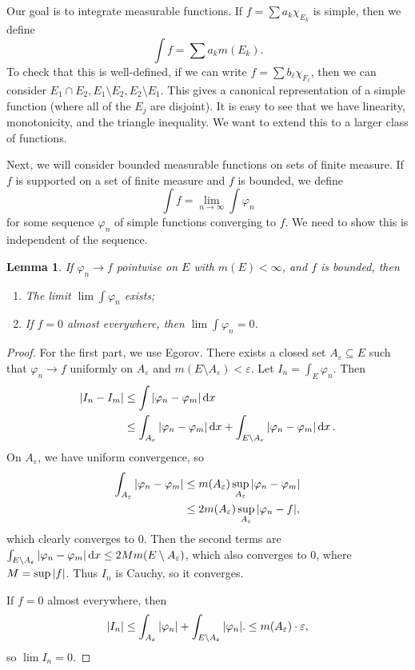 \documentclass[leqno, openany]{memoir}
\newtheorem{lem}[thm]{Lemma}
\theoremstyle{definition}
\theoremstyle{remark}
\theoremstyle{plain}
\theoremstyle{definition}
\theoremstyle{remark}
\newcommand{\ep}{\varepsilon}
\begin{document}
Our goal is to integrate measurable functions. If $f = \sum a_k \chi_{E_k}$ is
simple, then we define \[ \int f = \sum a_k m(E_k). \] To check that this is
well-defined, if we can write $f = \sum b_{\ell} \chi_{F_{\ell}}$, then we can
consider $E_1 \cap E_2, E_1 \setminus E_2, E_2 \setminus E_1$. This gives a
canonical representation of a simple function (where all of the $E_j$ are
disjoint).  It is easy to see that we have linearity, monotonicity, and the
triangle inequality. We want to extend this to a larger class of functions.

Next, we will consider bounded measurable functions on sets of finite measure.
If $f$ is supported on a set of finite measure and $f$ is bounded, we define \[
\int f = \lim_{n \to \infty} \int \varphi_n \] for some sequence $\varphi_n$ of
simple functions converging to $f$. We need to show this is independent of the
sequence.

\begin{lem} If $\varphi_n \to f$ pointwise on $E$ with $m(E) < \infty$, and $f$
is bounded, then \begin{enumerate} \item The limit $\lim \int \varphi_n$
exists; \item If $f = 0$ almost everywhere, then $\lim \int \varphi_n = 0$.
\end{enumerate} \end{lem}

\begin{proof} For the first part, we use Egorov. There exists a closed set
    $A_{\ep} \subseteq E$ such that $\varphi_n \to f$ uniformly on $A_{\ep}$
    and $m(E \setminus A_{\ep}) < \ep$. Let $I_n = \int_E \varphi_n$. Then
    \begin{align*} \abs{I_n - I_m} &\leq \int \abs{\varphi_n - \varphi_m}
        \dd{x} \\ &\leq \int_{A_{\ep}} \abs{\varphi_n - \varphi_m} \dd{x} +
        \int_{E \setminus A_{\ep}} \abs{\varphi_n - \varphi_m} \dd{x}.
        \end{align*} On $A_{\ep}$, we have uniform convergence, so
        \begin{align*} \int_{A_{\ep}} \abs{\varphi_n - \varphi_m} &\leq
            m(A_{\ep}) \sup_{A_{\ep}} \abs{\varphi_n - \varphi_m} \\ &\leq
        2m(A_{\ep}) \sup_{A_{\ep}} \abs{\varphi_n - f}, \end{align*} which
        clearly converges to $0$. Then the second terms are $\int_{E \setminus
        A_{\ep}} \abs{\varphi_n - \varphi_m} \dd{x} \leq 2M m(E \setminus
        A_{\ep})$, which also converges to $0$, where $M = \sup \abs{f}$. Thus
        $I_n$ is Cauchy, so it converges.

    If $f = 0$ almost everywhere, then \[ \abs{I_n} \leq \int_{A_{\ep}}
    \abs{\varphi_n} + \int_{E \setminus A_{\ep}} \abs{\varphi_n}. \leq
m(A_{\ep}) \cdot \ep, \] so $\lim I_n = 0$.  \end{proof}
\end{document}
